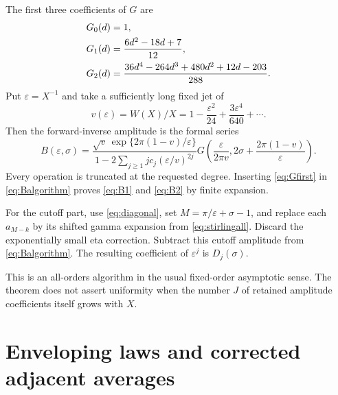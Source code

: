 \documentclass[11pt,a4paper]{article}
\theoremstyle{definition}
\numberwithin{equation}{section}
\begin{document}
The first three coefficients of $G$ are
\begin{align}
 G_0(d)&=1,\notag\\
 G_1(d)&=\frac{6d^2-18d+7}{12},\notag\\
 G_2(d)&=\frac{36d^4-264d^3+480d^2+12d-203}{288}.
 \label{eq:Gfirst}
\end{align}
Put $\varepsilon=X^{-1}$ and take a sufficiently long fixed jet of
\[
 v(\varepsilon)=W(X)/X
 =1-\frac{\varepsilon^2}{24}+\frac{3\varepsilon^4}{640}+\cdots.
\]
Then the forward-inverse amplitude is the formal series
\begin{equation}
 B(\varepsilon,\sigma)=
 \frac{\sqrt v\,\exp\{2\pi(1-v)/\varepsilon\}}
 {1-2\sum_{j\ge1}j c_j(\varepsilon/v)^{2j}}
 G\left(\frac{\varepsilon}{2\pi v},
                 2\sigma+\frac{2\pi(1-v)}\varepsilon\right).
 \label{eq:Balgorithm}
\end{equation}
Every operation is truncated at the requested degree. Inserting \eqref{eq:Gfirst} in \eqref{eq:Balgorithm} proves \eqref{eq:B1} and \eqref{eq:B2} by finite expansion.

For the cutoff part, use \eqref{eq:diagonal}, set
$M=\pi/\varepsilon+\sigma-1$, and replace each $a_{M-k}$ by its shifted gamma expansion from \eqref{eq:stirlingall}. Discard the exponentially small eta correction. Subtract this cutoff amplitude from \eqref{eq:Balgorithm}. The resulting coefficient of $\varepsilon^j$ is $D_j(\sigma)$.

This is an all-orders algorithm in the usual fixed-order asymptotic sense. The theorem does not assert uniformity when the number $J$ of retained amplitude coefficients itself grows with $X$.

\section{Enveloping laws and corrected adjacent averages}
\label{sec:averages}
\end{document}
